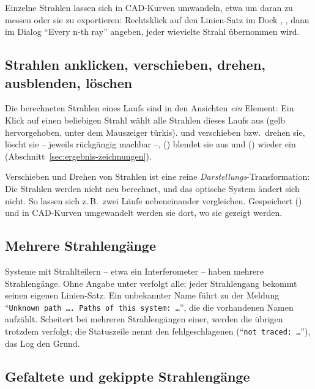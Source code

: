 \begin{tipp}
Einzelne Strahlen lassen sich in CAD-Kurven umwandeln, etwa um daran zu messen oder sie zu
exportieren: Rechtsklick auf den Linien-Satz im Dock , , dann im Dialog \enquote{Every n-th ray} angeben, jeder wievielte Strahl übernommen
wird.
\end{tipp}

\subsection{Strahlen anklicken, verschieben, drehen, ausblenden, löschen}\label{sec:rt-strahlen-objekt}

Die berechneten Strahlen eines Laufs sind in den Ansichten \emph{ein} Element: Ein Klick auf
einen beliebigen Strahl wählt alle Strahlen dieses Laufs aus (gelb hervorgehoben, unter dem
Mauszeiger türkis).  und  verschieben bzw.\ drehen sie, 
löscht sie -- jeweils rückgängig machbar --,  () blendet sie aus und
 () wieder ein (Abschnitt~\ref{sec:ergebnis-zeichnungen}).

\begin{hinweis}
Verschieben und Drehen von Strahlen ist eine reine \emph{Darstellungs}-Transformation: Die
Strahlen werden nicht neu berechnet, und das optische System ändert sich nicht. So lassen sich
z.\,B.\ zwei Läufe nebeneinander vergleichen. Gespeichert () und in CAD-Kurven
umgewandelt werden sie dort, wo sie gezeigt werden.
\end{hinweis}

\subsection{Mehrere Strahlengänge}

Systeme mit Strahlteilern -- etwa ein Interferometer -- haben mehrere Strahlengänge. Ohne Angabe
unter  verfolgt  alle; jeder Strahlengang bekommt seinen eigenen
Linien-Satz. Ein unbekannter Name führt zu der Meldung \enquote{\texttt{Unknown path …. Paths of
this system: …}}, die die vorhandenen Namen aufzählt. Scheitert bei mehreren Strahlengängen einer,
werden die übrigen trotzdem verfolgt; die Statuszeile nennt den fehlgeschlagenen
(\enquote{\texttt{not traced: …}}), das Log den Grund.

\subsection{Gefaltete und gekippte Strahlengänge}\label{sec:rt-gefaltet}

